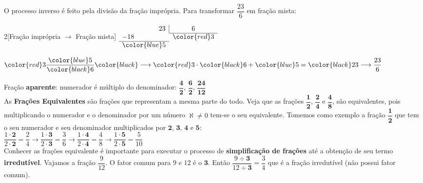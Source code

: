  	O processo inverso é feito pela divisão da fração imprópria. Para transformar $ \dfrac{23}{6} $ em fração mista: \\
 	
 	\begin{multicols}{2}[Fração imprópria $ \longrightarrow $ Fração mista]
	\setlength{\columnseprule}{.5pt}
 	$
 	\begin{array}{l l r r}
 	\multicolumn{2}{r}{23} \vline & \multicolumn{2}{c}{6} \\ \cline{3-4}
 	\multicolumn{2}{l}{-18} & \multicolumn{2}{l}{\color{red}3} \\ \cline{1-2}
 	\multicolumn{2}{r}{\color{blue}5} &  \\
 	\end{array}
 	$
 	
 	\columnbreak
	$
	\color{red}3 \dfrac{\color{blue}5}{\color{black}6} \color{black} \longrightarrow \color{red}3 \cdot \color{black}6 + \color{blue}5 = \color{black}23 \longrightarrow \dfrac{23}{6}
	$
 \end{multicols}

 	\indent \indent Fração \textbf{aparente}: numerador é múltiplo do denominador: $\dfrac{\textbf{4}}{\textbf{2}}$, $\dfrac{\textbf{6}}{\textbf{2}}$, $\dfrac{\textbf{24}}{\textbf{12}}$ \\
	 	
 	As \textbf{Frações Equivalentes} são frações que representam a mesma parte do todo. Veja que as frações $\dfrac{\textbf{1}}{\textbf{2}}$, $\dfrac{\textbf{2}}{\textbf{4}}$ e $\dfrac{\textbf{4}}{\textbf{8}}$, são equivalentes, pois multiplicando o numerador e o denominador por um número \textbf{$\aleph \neq 0$} tem-se o seu equivalente. Tomemos como exemplo a fração $\dfrac{\textbf{1}}{\textbf{2}}$ que tem o seu numerador e seu denominador multiplicados por $\textbf{2, 3, 4}$ e $\textbf{5}$: \\
 	
 	$\dfrac{1\cdot\textbf{2}}{2\cdot\textbf{2}} = \dfrac{2}{4} \longrightarrow \dfrac{1\cdot\textbf{3}}{2\cdot\textbf{3}} = \dfrac{3}{6} \longrightarrow \dfrac{1\cdot\textbf{4}}{2\cdot\textbf{4}} = \dfrac{4}{8} \longrightarrow \dfrac{1\cdot\textbf{5}}{2\cdot\textbf{5}} = \dfrac{5}{10}$ \\
 	
 	Conhecer as frações equivalente é importante para executar o processo de \textbf{simplificação de frações} até a obtenção de seu termo \textbf{irredutível}. Vajamos a fração $\dfrac{9}{12}$. O fator comum para $9$ e $12$ é o $\textbf{3}$. Então $\dfrac{9\div\textbf{3}}{12\div\textbf{3}} = \dfrac{3}{4}$ que é a fração irredutível (não possui fator comum). \\
 	
